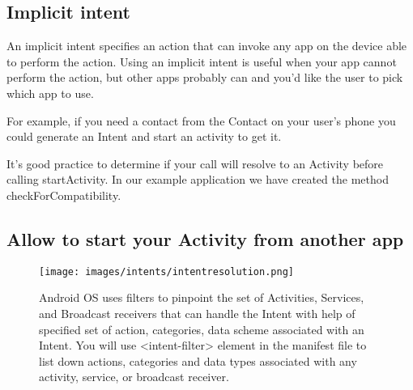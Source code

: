 

\subsection{Implicit intent}
An implicit intent specifies an action that can invoke any app on the device able to perform the action. Using an implicit intent is useful when your app cannot perform the action, but other apps probably can and you'd like the user to pick which app to use.

For example, if you need a contact from the Contact on your user's phone you could generate an Intent and start an activity to get it. 




\begin{framed}
It's good practice to determine if your call will resolve to an Activity before calling startActivity. In our example application we have created the method checkForCompatibility.
\end{framed}






\subsection{Allow to start your Activity from another app}

\begin{figure}
	\texttt{[image: images/intents/intentresolution.png]}
	\caption{Android OS uses filters to pinpoint the set of Activities, Services, and Broadcast receivers that can handle the Intent with help of specified set of action, categories, data scheme associated with an Intent. You will use <intent-filter> element in the manifest file to list down actions, categories and data types associated with any activity, service, or broadcast receiver.}
	\label{fig:intentresolution}
\end{figure}

